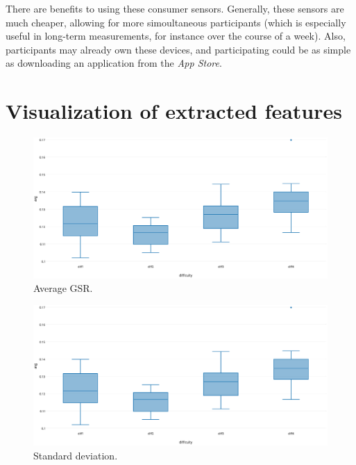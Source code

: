 \documentclass[11pt,leqno,a4paper]{report} %
\begin{document}
There are benefits to using these consumer sensors. Generally, these sensors are much cheaper, allowing for more simoultaneous participants (which is especially useful in long-term measurements, for instance over the course of a week). Also, participants may already own these devices, and participating could be as simple as downloading an application from the \emph{App Store}.
 

\appendix
\chapter{Visualization of extracted features}


\begin{figure}[H]
  \centering
 	\hspace*{-.3\textwidth}   
 	\includegraphics[width=1.6\textwidth]{avggsr.eps}
  \caption{Average GSR.}
\end{figure}

\begin{figure}[H]
  \centering
 	\hspace*{-.3\textwidth}   
 	\includegraphics[width=1.6\textwidth]{avggsr.eps}
  \caption{Standard deviation.}
\end{figure}
\end{document}

